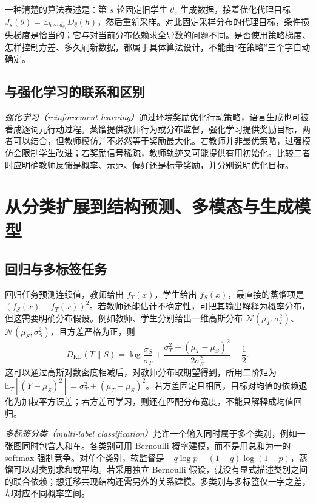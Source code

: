 \documentclass[UTF8,12pt,a4paper,fontset=fandol]{ctexart}
\begin{document}
一种清楚的算法表述是：第 $s$ 轮固定旧学生 $\theta_s$ 生成数据，接着优化代理目标 $J_s(\theta)=\mathbb E_{h\sim d_{\theta_s}}D_\theta(h)$，然后重新采样。对此固定采样分布的代理目标，条件损失梯度是恰当的；它与对当前分布依赖求全导数的问题不同。是否使用策略梯度、怎样控制方差、多久刷新数据，都属于具体算法设计，不能由“在策略”三个字自动确定。

\subsection{与强化学习的联系和区别}
\emph{强化学习（reinforcement learning）}通过环境奖励优化行动策略，语言生成也可被看成逐词元行动过程。蒸馏提供教师行为或分布监督，强化学习提供奖励目标，两者可以结合，但教师模仿并不必然等于奖励最大化。若教师并非最优策略，过强模仿会限制学生改进；若奖励信号稀疏，教师轨迹又可能提供有用初始化。比较二者时应明确教师反馈是概率、示范、偏好还是标量奖励，并分别说明优化目标。

\section{从分类扩展到结构预测、多模态与生成模型}
\label{sec:kd-applications}

\subsection{回归与多标签任务}
回归任务预测连续值，教师给出 $f_T(x)$，学生给出 $f_S(x)$，最直接的蒸馏项是 $(f_S(x)-f_T(x))^2$。若教师还能估计不确定性，可把其输出解释为概率分布，但这需要明确分布假设。例如教师、学生分别给出一维高斯分布 $\mathcal N(\mu_T,\sigma_T^2)$、$\mathcal N(\mu_S,\sigma_S^2)$，且方差严格为正，则
\begin{equation}
 D_{\mathrm{KL}}(T\|S)=\log\frac{\sigma_S}{\sigma_T}
 +\frac{\sigma_T^2+(\mu_T-\mu_S)^2}{2\sigma_S^2}-\frac12.
 \label{eq:kd-gaussian}
\end{equation}
这可以通过高斯对数密度相减后，对教师分布取期望得到，所用二阶矩为 $\mathbb E_T[(Y-\mu_S)^2]=\sigma_T^2+(\mu_T-\mu_S)^2$。若方差固定且相同，目标对均值的依赖退化为加权平方误差；若方差可学习，则还在匹配分布宽度，不能只解释成均值回归。

\emph{多标签分类（multi-label classification）}允许一个输入同时属于多个类别，例如一张图同时包含人和车。各类别可用 Bernoulli 概率建模，而不是用总和为一的 softmax 强制竞争。对单个类别，软监督是 $-q\log p-(1-q)\log(1-p)$，蒸馏可以对类别求和或平均。若采用独立 Bernoulli 假设，就没有显式描述类别之间的联合依赖；想迁移共现结构还需另外的关系建模。多类别与多标签仅一字之差，却对应不同概率空间。
\end{document}
